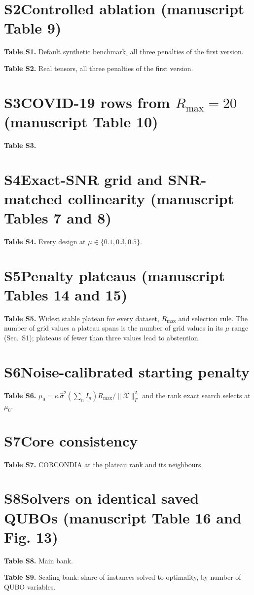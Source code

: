 \documentclass[10pt]{article}
\newcommand{\T}[1]{}
\begin{document}
\section*{S2\quad Controlled ablation (manuscript Table 9)}
\textbf{Table S1.} Default synthetic benchmark, all three penalties of the first version.
\T{tableR1_ablation_synthetic.tex}
\textbf{Table S2.} Real tensors, all three penalties of the first version.
\T{tableR1_ablation_real.tex}

\section*{S3\quad COVID-19 rows from \(R_{\max}=20\) (manuscript Table 10)}
\textbf{Table S3.}
\T{table7_covid_fixed_rows.tex}

\section*{S4\quad Exact-SNR grid and SNR-matched collinearity (manuscript Tables 7 and 8)}
\textbf{Table S4.} Every design at \(\mu\in\{0.1,0.3,0.5\}\).
\T{tableR2-7_snr_and_rho.tex}

\section*{S5\quad Penalty plateaus (manuscript Tables 14 and 15)}
\textbf{Table S5.} Widest stable plateau for every dataset, \(R_{\max}\) and selection rule. The number of grid values a
plateau spans is the number of grid values in its \(\mu\) range (Sec.~S1); plateaus of fewer than three values lead to
abstention.
\T{tableC1_plateaus.tex}

\section*{S6\quad Noise-calibrated starting penalty}
\textbf{Table S6.} \(\mu_0=\kappa\,\hat\sigma^2(\sum_n I_n)R_{\max}/\|\mathcal X\|_F^2\) and the rank exact search
selects at \(\mu_0\).
\T{tableC1_sigma_rule.tex}

\section*{S7\quad Core consistency}
\textbf{Table S7.} CORCONDIA at the plateau rank and its neighbours.
\T{tableC1_corcondia.tex}

\section*{S8\quad Solvers on identical saved QUBOs (manuscript Table 16 and Fig. 13)}
\begin{landscape}
\textbf{Table S8.} Main bank.
{\footnotesize\setlength{\tabcolsep}{4pt}\T{tableR2_solver_bank.tex}}
\end{landscape}
\textbf{Table S9.} Scaling bank: share of instances solved to optimality, by number of QUBO variables.
\T{tableR3-2_scaling.tex}
\end{document}
